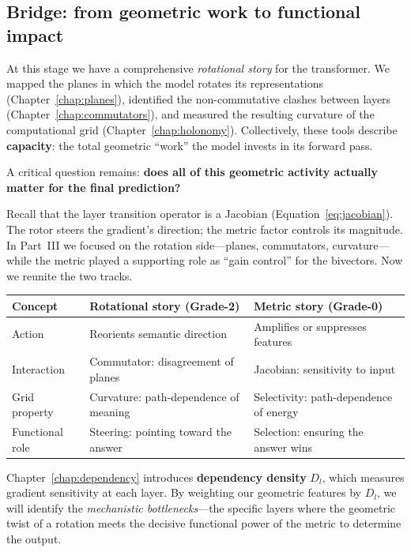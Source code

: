 \documentclass[11pt, twoside, openright]{memoir}
\numberwithin{equation}{chapter}
\begin{document}
\subsection*{Bridge: from geometric work to functional impact}

At this stage we have a comprehensive \emph{rotational story} for
the transformer.  We mapped the planes in which the model rotates its
representations (Chapter~\ref{chap:planes}), identified the
non-commutative clashes between layers
(Chapter~\ref{chap:commutators}), and measured the resulting curvature
of the computational grid (Chapter~\ref{chap:holonomy}).  Collectively,
these tools describe \textbf{capacity}: the total geometric ``work''
the model invests in its forward pass.

A critical question remains: \textbf{does all of this geometric
activity actually matter for the final prediction?}

Recall that the layer transition operator is a Jacobian
(Equation~\ref{eq:jacobian}).  The rotor steers the gradient's
direction; the metric factor controls its magnitude.  In Part~III we
focused on the rotation side---planes, commutators, curvature---while
the metric played a supporting role as ``gain control'' for the
bivectors.  Now we reunite the two tracks.

\medskip
\begin{center}
\renewcommand{\arraystretch}{1.3}\small
\begin{tabular}{@{} l l l @{}}
\toprule
\textbf{Concept} & \textbf{Rotational story (Grade-2)}
  & \textbf{Metric story (Grade-0)} \\
\midrule
Action & Reorients semantic direction
  & Amplifies or suppresses features \\
Interaction & Commutator: disagreement of planes
  & Jacobian: sensitivity to input \\
Grid property & Curvature: path-dependence of meaning
  & Selectivity: path-dependence of energy \\
Functional role & Steering: pointing toward the answer
  & Selection: ensuring the answer wins \\
\bottomrule
\end{tabular}
\end{center}
\medskip

Chapter~\ref{chap:dependency} introduces \textbf{dependency density}
$D_l$, which measures gradient sensitivity at each layer.  By weighting
our geometric features by $D_l$, we will identify the
\emph{mechanistic bottlenecks}---the specific layers where the
geometric twist of a rotation meets the decisive functional power of
the metric to determine the output.
\end{document}
